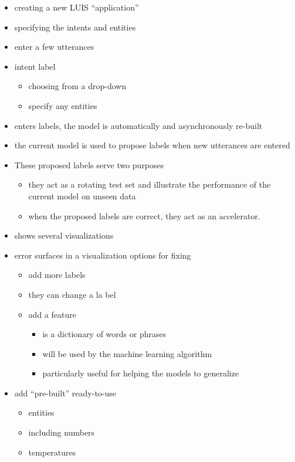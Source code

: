 	\begin{itemize}
		\item creating a new LUIS “application”
		\item specifying the intents and entities
		\item enter a few utterances
		\item intent label
			\begin{itemize}
				\item choosing from a drop-down
				\item specify any entities
			\end{itemize}

		\item enters labels, the model is automatically and asynchronously re-built
		\item the current model is used to propose labels when new utterances are entered
		\item These proposed labels serve two purposes
			\begin{itemize}
				\item they act as a rotating test set and illustrate the performance of the current model on unseen data
				\item when the proposed labels are correct, they act as an accelerator.
			\end{itemize}
		\item shows several visualizations
		\item error surfaces in a visualization options for fixing
			\begin{itemize}
				\item add more labels
				\item they can change a la bel
				\item add a feature
					\begin{itemize}
						\item is a dictionary of words or phrases
						\item will be used by the machine learning algorithm
						\item particularly useful for helping the models to generalize
					\end{itemize}
			\end{itemize}
		\item add “pre-built” ready-to-use
			\begin{itemize}
				\item entities
				\item including numbers
				\item temperatures

\end{itemize}
\end{itemize}
